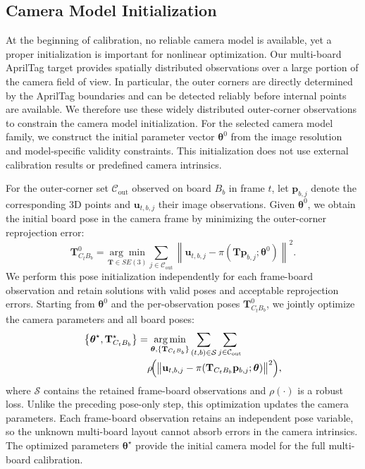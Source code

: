\documentclass[letterpaper, 10 pt, conference]{ieeeconf}  %
\begin{document}
\subsection{Camera Model Initialization}
\label{subsec:camera_model_initialization}

At the beginning of calibration, no reliable camera model is available, yet a
proper initialization is important for nonlinear optimization. Our multi-board
AprilTag target provides spatially distributed observations over a large
portion of the camera field of view. In particular, the outer corners are
directly determined by the AprilTag boundaries and can be detected reliably
before internal points are available. We therefore use these widely distributed
outer-corner observations to constrain the camera model initialization. For the
selected camera model family, we construct the initial parameter vector
$\boldsymbol{\theta}^{0}$ from the image resolution and model-specific validity
constraints. This initialization does not use external calibration results or
predefined camera intrinsics.

For the outer-corner set $\mathcal{C}_{\mathrm{out}}$ observed on board $B_b$
in frame $t$, let $\mathbf{p}_{b,j}$ denote the corresponding 3D points and
$\mathbf{u}_{t,b,j}$ their image observations. Given
$\boldsymbol{\theta}^{0}$, we obtain the initial board pose in the camera frame
by minimizing the outer-corner reprojection error:
\begin{equation}
\mathbf{T}_{C_tB_b}^{0}
=
\underset{\mathbf{T}\in SE(3)}{\arg\min}
\sum_{j\in\mathcal{C}_{\mathrm{out}}}
\left\|
\mathbf{u}_{t,b,j}
-
\pi\!\left(\mathbf{T}\mathbf{p}_{b,j};\boldsymbol{\theta}^{0}\right)
\right\|^{2}.
\label{eq:outer_pose_init}
\end{equation}
We perform this pose initialization independently for each frame-board
observation and retain solutions with valid poses and acceptable reprojection
errors. Starting from $\boldsymbol{\theta}^{0}$ and the per-observation poses
$\mathbf{T}_{C_tB_b}^{0}$, we jointly optimize the camera parameters and all
board poses:
\begin{equation}
\begin{aligned}
\left\{
\boldsymbol{\theta}^{\star},
\mathbf{T}_{C_tB_b}^{\star}
\right\}
&=
\underset{\boldsymbol{\theta},\{\mathbf{T}_{C_tB_b}\}}{\arg\min}
\sum_{(t,b)\in\mathcal{S}}
\sum_{j\in\mathcal{C}_{\mathrm{out}}}
\\[-0.2em]
&\quad
\rho\!\Bigl(
\bigl\|
\mathbf{u}_{t,b,j}
-
\pi\!\left(
\mathbf{T}_{C_tB_b}\mathbf{p}_{b,j};\boldsymbol{\theta}
\right)
\bigr\|^{2}
\Bigr),
\end{aligned}
\label{eq:outer_joint_init}
\end{equation}
where $\mathcal{S}$ contains the retained frame-board observations and
$\rho(\cdot)$ is a robust loss. Unlike the preceding pose-only step, this
optimization updates the camera parameters. Each frame-board observation
retains an independent pose variable, so the unknown multi-board layout cannot
absorb errors in the camera intrinsics. The optimized parameters
$\boldsymbol{\theta}^{\star}$ provide the initial camera model for the full
multi-board calibration.
\end{document}
